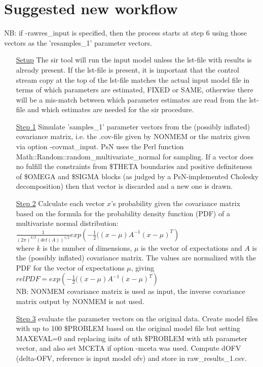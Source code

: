 \section{Suggested new workflow}
NB: if -rawres\_input is specified, then the process starts
at step 6 using those vectors as the 'resamples\_1' parameter vectors.
\begin{itemize}
\item[\underline{Setup}] The sir tool will run the input model unless the lst-file with results is already present.
If the lst-file is present, it
is important that the control stream copy at the top of the lst-file matches the
actual input model file in terms of which parameters are estimated,
FIXED or SAME, otherwise there will be a mis-match between which parameter estimates are read from the
lst-file and which estimates are needed for the sir procedure.
\item[\underline{Step 1}] Simulate 'samples\_1' parameter vectors from the
(possibly inflated)
covariance matrix, i.e. the .cov-file given by NONMEM
or the matrix given via option -covmat\_input. PsN uses the Perl function\\
Math::Random::random\_multivariate\_normal
for sampling. If a vector does no fulfill the constraints from \$THETA boundaries
and positive definiteness of \$OMEGA and
\$SIGMA blocks (as judged by a PsN-implemented Cholesky decomposition)
then that vector is
discarded and a new one is drawn.
\item[\underline{Step 2}] Calculate each vector $x$’s probability
given the covariance matrix based on the formula for the probability
density function (PDF) of a multivariate normal distribution:\\
\begin{math}
\frac{1}{\left(2\pi\right)^{k/2}\left(det\left(A\right)\right)^{1/2}} exp\left(-\frac{1}{2}(\left(x-\mu\right)A^{-1} \left(x-\mu\right)^T\right)
\end{math}
\\
where $k$ is the number of dimensions,
$\mu$ is the vector of expectations and $A$ is the (possibly inflated) covariance matrix.
The values are normalized with the PDF for the vector of expectations $\mu$, giving\\
\begin{math}
relPDF=exp\left(-\frac{1}{2}(\left(x-\mu\right)A^{-1} \left(x-\mu\right)^T\right)
\end{math}
\\
NB: NONMEM covariance matrix is used as input, the inverse covariance matrix
output by NONMEM is not used.
\item[\underline{Step 3}] evaluate the parameter vectors on the original data.
Create model files with up to 100 \$PROBLEM based on the original model file but setting MAXEVAL=0
and replacing inits of nth \$PROBLEM with nth parameter vector, and also set MCETA if option -mceta was used. Compute dOFV
(delta-OFV, reference is input model ofv) and store in raw\_results\_1.csv.


\end{itemize}
